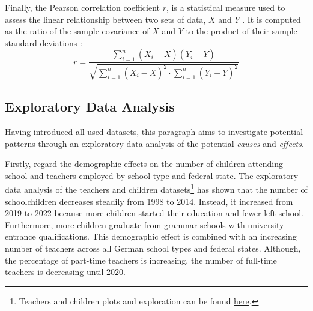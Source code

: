 Finally, the Pearson correlation coefficient $r$, is a statistical measure used to assess the linear relationship between two sets of data, $X$ and $Y$ \cite{rodgers_thirteen_1988}. It is computed as the ratio of the sample covariance of $X$ and $Y$ to the product of their sample standard deviations \cite{rodgers_thirteen_1988}:
\begin{equation}
    r = \frac{\sum_{i=1}^n (X_i - \overline{X}) (Y_i - \overline{Y})}{\sqrt{\sum_{i=1}^n(X_i-\overline{X})^2 \cdot \sum_{i=1}^n(Y_i-\overline{Y})^2}}
\end{equation}

\subsection{Exploratory Data Analysis}\label{sec:analysis}
Having introduced all used datasets, this paragraph aims to investigate potential patterns through an exploratory data analysis of the potential \emph{causes} and \emph{effects}. 

Firstly, regard the demographic effects on the number of children attending school and teachers employed by school type and federal state. The exploratory data analysis of the teachers and children datasets\footnote{\label{footnote:teachers-children}Teachers and children plots and exploration can be found \href{https://github.com/KarylReyne/DataLiteracyWS23/blob/main/exp/TF-005-TeachersToChildren.ipynb}{here}.} has shown that the number of schoolchildren decreases steadily from 1998 to 2014. Instead, it increased from 2019 to 2022 because more children started their education and fewer left school. Furthermore, more children graduate from grammar schools with university entrance qualifications. This demographic effect is combined with an increasing number of teachers across all German school types and federal states. Although, the percentage of part-time teachers is increasing, the number of full-time teachers is decreasing until 2020.


